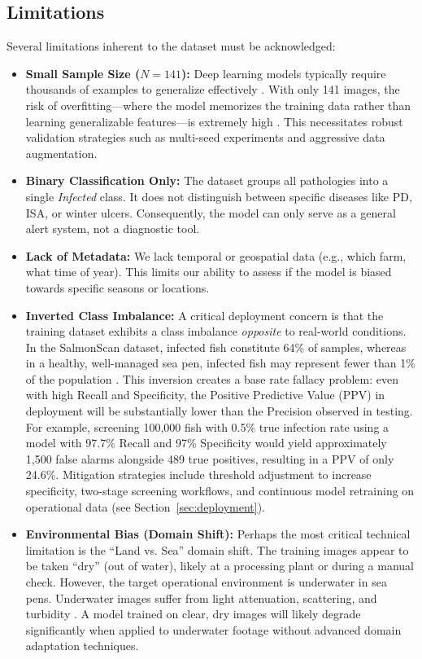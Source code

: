 \documentclass[12pt,a4paper]{article}
\begin{document}
\subsection{Limitations}
Several limitations inherent to the dataset must be acknowledged:
\begin{itemize}
    \item \textbf{Small Sample Size ($N=141$):} Deep learning models typically require thousands of examples to generalize effectively \citep{BejaniGhatee2021}. With only 141 images, the risk of overfitting---where the model memorizes the training data rather than learning generalizable features---is extremely high \citep{Shorten2019}. This necessitates robust validation strategies such as multi-seed experiments and aggressive data augmentation.
    \item \textbf{Binary Classification Only:} The dataset groups all pathologies into a single \emph{Infected} class. It does not distinguish between specific diseases like PD, ISA, or winter ulcers. Consequently, the model can only serve as a general alert system, not a diagnostic tool.
    \item \textbf{Lack of Metadata:} We lack temporal or geospatial data (e.g., which farm, what time of year). This limits our ability to assess if the model is biased towards specific seasons or locations.
    \item \textbf{Inverted Class Imbalance:} A critical deployment concern is that the training dataset exhibits a class imbalance \emph{opposite} to real-world conditions. In the SalmonScan dataset, infected fish constitute 64\% of samples, whereas in a healthy, well-managed sea pen, infected fish may represent fewer than 1\% of the population \citep{NVI_2025_NFHR2024}. This inversion creates a base rate fallacy problem: even with high Recall and Specificity, the Positive Predictive Value (PPV) in deployment will be substantially lower than the Precision observed in testing. For example, screening 100,000 fish with 0.5\% true infection rate using a model with 97.7\% Recall and 97\% Specificity would yield approximately 1,500 false alarms alongside 489 true positives, resulting in a PPV of only 24.6\%. Mitigation strategies include threshold adjustment to increase specificity, two-stage screening workflows, and continuous model retraining on operational data (see Section~\ref{sec:deployment}).
    \item \textbf{Environmental Bias (Domain Shift):} Perhaps the most critical technical limitation is the ``Land vs. Sea'' domain shift. The training images appear to be taken ``dry'' (out of water), likely at a processing plant or during a manual check. However, the target operational environment is underwater in sea pens. Underwater images suffer from light attenuation, scattering, and turbidity \citep{JIAN2021116088}. A model trained on clear, dry images will likely degrade significantly when applied to underwater footage without advanced domain adaptation techniques.
\end{itemize}
\end{document}
